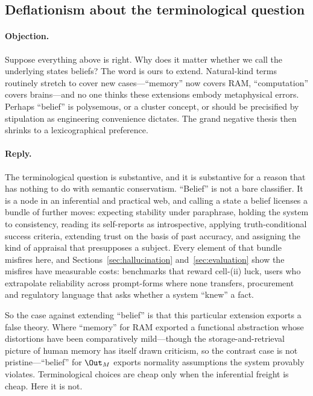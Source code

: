 \subsection{Deflationism about the terminological question}
\label{sec:deflationism}

\paragraph{Objection.} Suppose everything above is right. Why does it matter
whether we call the underlying states beliefs? The word is ours to extend.
Natural-kind terms routinely stretch to cover new cases---``memory'' now covers
RAM, ``computation'' covers brains---and no one thinks these extensions embody
metaphysical errors. Perhaps ``belief'' is polysemous, or a cluster concept, or
should be precisified by stipulation as engineering convenience dictates. The
grand negative thesis then shrinks to a lexicographical preference.

\paragraph{Reply.} The terminological question is substantive, and it is
substantive for a reason that has nothing to do with semantic conservatism.
``Belief'' is not a bare classifier. It is a node in an inferential and practical
web, and calling a state a belief licenses a bundle of further moves: expecting
stability under paraphrase, holding the system to consistency, reading its
self-reports as introspective, applying truth-conditional success criteria,
extending trust on the basis of past accuracy, and assigning the kind of appraisal
that presupposes a subject. Every element of that bundle misfires here, and
Sections~\ref{sec:hallucination} and~\ref{sec:evaluation} show the misfires have
measurable costs: benchmarks that reward cell-(ii) luck, users who extrapolate
reliability across prompt-forms where none transfers, procurement and regulatory
language that asks whether a system ``knew'' a fact.

So the case against extending ``belief'' is that this particular extension exports
a false theory. Where ``memory'' for RAM exported a functional abstraction whose
distortions have been comparatively mild---though the storage-and-retrieval
picture of human memory has itself drawn criticism, so the contrast case is not
pristine---``belief'' for $\Out_M$ exports normality assumptions the system
provably violates. Terminological choices are cheap only when the inferential
freight is cheap. Here it is not.

